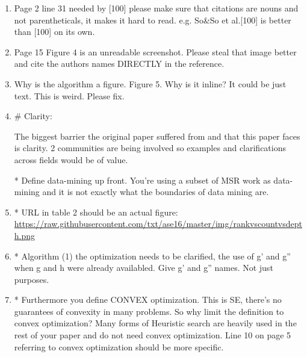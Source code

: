 \documentclass{article}
\newenvironment{com}{\color{blue}\begin{itshape}}{\end{itshape}\vspace{1ex}}
\begin{document}
\begin{enumerate}
\item \begin{com}
Page 2 line 31 needed by [100] please make sure that citations are
nouns and not parentheticals, it makes it hard to read. e.g. So\&So et
al.[100] is better than [100] on its own.
\end{com}

\item \begin{com}
Page 15 Figure 4 is an unreadable screenshot. Please steal that image
better and cite the authors names DIRECTLY in the reference.
\end{com}

\item \begin{com}
Why is the algorithm a figure. Figure 5. Why is it inline?
It could be just text. This is weird. Please fix.
\end{com}

\item \begin{com}
\# Clarity:

The biggest barrier the original paper suffered from and that this
paper faces is clarity. 2 communities are being involved so examples
and clarifications across fields would be of value.

* Define data-mining up front. You're using a subset of MSR work as
  data-mining and it is not exactly what the boundaries of data mining
  are.
\end{com}

\item \begin{com}
* URL in table 2 should be an actual figure: \\
  \url{https://raw.githubusercontent.com/txt/ase16/master/img/rankvscountvsdepth.png}
\end{com}

\item \begin{com}
* Algorithm (1) the optimization needs to be clarified, the use of g'
  and g'' when g and h were already availabled.
  Give g' and g'' names. Not just purposes.
\end{com}

\item \begin{com}
* Furthermore you define CONVEX optimization. This is SE, there's no
  guarantees of convexity in many problems. So why limit the
  definition to convex optimization? Many forms of Heuristic search are
  heavily used in the rest of your paper and do not need convex optimization.
  Line 10 on page 5 referring to convex optimization should be more specific.
\end{com}


\end{enumerate}
\end{document}
